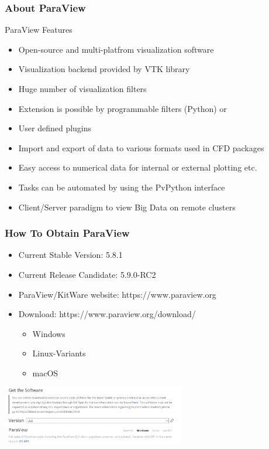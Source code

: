 \begin{frame}
	\frametitle{About ParaView}

      \begin{block}{ParaView Features}
        \begin{itemize}
		\item Open-source and multi-platfrom visualization software
		\item Visualization backend provided by VTK library
		\item Huge number of visualization filters  
                \item Extension is possible by programmable filters (Python) or 
                \item User defined plugins  
		\item Import and export of data to various formats used in CFD packages
		\item Easy access to numerical data for internal or external plotting etc.
		\item Tasks can be automated by using the PvPython interface
		\item Client/Server paradigm to view Big Data on remote clusters
        \end{itemize}
      \end{block}

\end{frame}

\begin{frame}
  \frametitle{How To Obtain ParaView}
    \begin{itemize}
      \item Current Stable Version: 5.8.1
      \item Current Release Candidate: 5.9.0-RC2			
      \item ParaView/KitWare website: https://www.paraview.org
			\item Download: https://www.paraview.org/download/
      \begin{itemize}			
				\item Windows
				\item Linux-Variants
				\item macOS
      \end{itemize}			
    \end{itemize}
    \begin{center}
      \includegraphics[width=0.6\textwidth]{screenshots/download-pv.png}
    \end{center}		
\end{frame}

